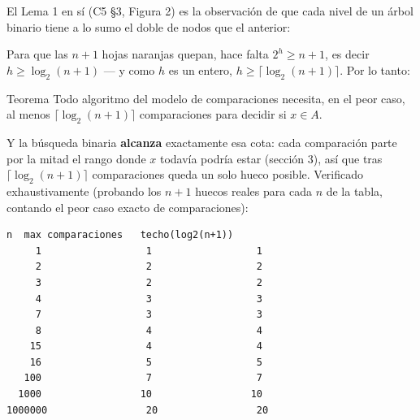 \documentclass[11pt]{article}
\begin{document}
El Lema 1 en sí (C5 §3, Figura 2) es la observación de que cada nivel de un árbol binario tiene a lo sumo
el doble de nodos que el anterior:

\begin{center}
\end{center}

Para que las $n{+}1$ hojas naranjas quepan, hace falta $2^h\ge n{+}1$, es decir $h\ge\log_2(n{+}1)$ --- y
como $h$ es un entero, $h\ge\lceil\log_2(n{+}1)\rceil$. Por lo tanto:

\begin{resultado}{Teorema}
Todo algoritmo del modelo de comparaciones necesita, en el peor caso, al menos
$\lceil\log_2(n{+}1)\rceil$ comparaciones para decidir si $x\in A$.
\end{resultado}

Y la búsqueda binaria \textbf{alcanza} exactamente esa cota: cada comparación parte por la mitad el rango
donde $x$ todavía podría estar (sección 3), así que tras $\lceil\log_2(n{+}1)\rceil$ comparaciones queda un
solo hueco posible. Verificado exhaustivamente (probando los $n+1$ huecos reales para cada $n$ de la tabla, contando el
peor caso exacto de comparaciones):

\begin{lstlisting}[style=salida]
     n  max comparaciones   techo(log2(n+1))
     1                  1                  1
     2                  2                  2
     3                  2                  2
     4                  3                  3
     7                  3                  3
     8                  4                  4
    15                  4                  4
    16                  5                  5
   100                  7                  7
  1000                 10                 10
1000000                 20                 20
\end{lstlisting}
\end{document}
